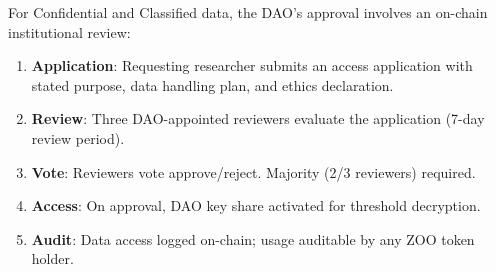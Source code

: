 For Confidential and Classified data, the DAO's approval involves an on-chain institutional review:

\begin{enumerate}
    \item \textbf{Application}: Requesting researcher submits an access application with stated purpose, data handling plan, and ethics declaration.
    \item \textbf{Review}: Three DAO-appointed reviewers evaluate the application (7-day review period).
    \item \textbf{Vote}: Reviewers vote approve/reject. Majority (2/3 reviewers) required.
    \item \textbf{Access}: On approval, DAO key share activated for threshold decryption.
    \item \textbf{Audit}: Data access logged on-chain; usage auditable by any ZOO token holder.
\end{enumerate}

